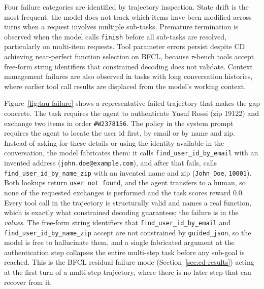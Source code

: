 Four failure categories are identified by trajectory inspection. State
drift is the most frequent: the model does not track which items have been
modified across turns when a request involves multiple sub-tasks. Premature
termination is observed when the model calls \texttt{finish} before all
sub-tasks are resolved, particularly on multi-item requests. Tool parameter
errors persist despite CD achieving near-perfect function selection
on BFCL, because $\tau$-bench tools accept free-form string identifiers
that constrained decoding does not validate. Context management failures
are also observed in tasks with long conversation histories, where earlier
tool call results are displaced from the model's working context.

Figure~\ref{fig:tau-failure} shows a representative failed trajectory that
makes the gap concrete. The task requires the agent to authenticate Yusuf
Rossi (zip 19122) and exchange two items in order \texttt{\#W2378156}. The
policy in the system prompt requires the agent to locate the user id first,
by email or by name and zip. Instead of asking for these details or using
the identity available in the conversation, the model fabricates them: it
calls \texttt{find\_user\_id\_by\_email} with an invented address
(\texttt{john.doe@example.com}), and after that fails, calls
\texttt{find\_user\_id\_by\_name\_zip} with an invented name and zip
(\texttt{John Doe}, \texttt{10001}). Both lookups return \texttt{user not
found}, and the agent transfers to a human, so none of the requested
exchanges is performed and the task scores reward 0.0. Every tool call in
the trajectory is structurally valid and names a real function, which is
exactly what constrained decoding guarantees; the failure is in the
\emph{values}. The free-form string identifiers that
\texttt{find\_user\_id\_by\_email} and \texttt{find\_user\_id\_by\_name\_zip}
accept are not constrained by \texttt{guided\_json}, so the model is free to
hallucinate them, and a single fabricated argument at the authentication
step collapses the entire multi-step task before any sub-goal is reached.
This is the BFCL residual failure mode (Section~\ref{sec:cd-results}) acting
at the first turn of a multi-step trajectory, where there is no later step
that can recover from it.


